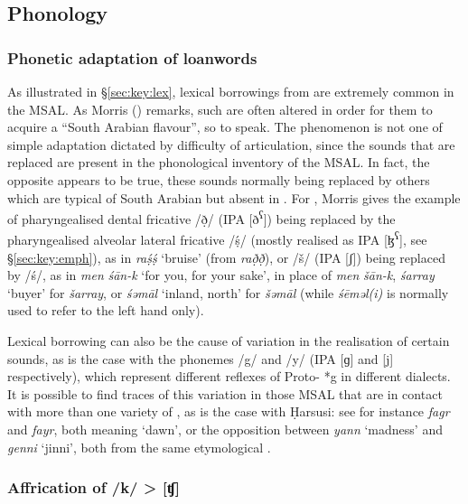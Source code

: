 \documentclass[output=paper]{langsci/langscibook}
\begin{document}
 
 \subsection{Phonology}
 \subsubsection{Phonetic adaptation of loanwords}

As illustrated in §\ref{sec:key:lex}, lexical borrowings from  are extremely common in the MSAL. As Morris (\citeyear[13]{Morris2017}) remarks, such  are often altered in order for them to acquire a “South Arabian flavour”, so to speak. The phenomenon is not one of simple adaptation dictated by difficulty of articulation, since the sounds that are replaced are present in the phonological inventory of the MSAL. In fact, the opposite appears to be true, these sounds normally being replaced by others which are typical of South Arabian but absent in . For , Morris gives the example of  pharyngealised dental fricative /\d{ð}/ (IPA [ð\textsuperscript{ʕ}]) being replaced by the pharyngealised alveolar lateral fricative /ṣ́/ (mostly realised as IPA [ɮ\textsuperscript{ʕ}], see §\ref{sec:key:emph}), as in \textit{raṣ́ṣ́} ‘bruise’ (from   \textit{rað̣ð̣}), or  /š/ (IPA [ʃ]) being replaced by /ś/, as in \textit{men} \textit{śān-k} ‘for you, for your sake’, in place of \textit{men} \textit{šān-k}, \textit{śarray} ‘buyer’ for \textit{šarray}, or \textit{śəmāl} ‘inland, north’ for \textit{šəmāl} (while  \textit{śēməl(i)} is normally used to refer to the left hand only). 

Lexical borrowing can also be the cause of variation in the realisation of certain sounds, as is the case with the phonemes /g/ and /y/ (IPA [ɡ] and [j] respectively), which represent different reflexes of Proto- *g in different   dialects. It is possible to find traces of this variation in those MSAL that are in contact with more than one variety of , as is the case with Ḥarsusi: see for instance \textit{fagr} and \textit{fayr}, both meaning ‘dawn’, or the opposition between \textit{yann} ‘madness’ and \textit{genni} ‘jinni’, both from the same etymological  \citep[299]{Lonnet2011}.


 \subsubsection{Affrication of /k/ > [ʧ]}
\end{document}
